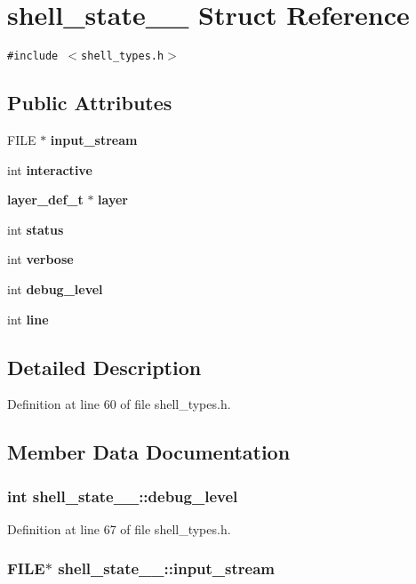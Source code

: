 \section{shell\_\-state\_\-\_\- Struct Reference}
\label{structshell__state____}
{\tt \#include $<$shell\_\-types.h$>$}

\subsection*{Public Attributes}
\begin{CompactItemize}
\item 
FILE $\ast$ {\bf input\_\-stream}
\item 
int {\bf interactive}
\item 
{\bf layer\_\-def\_\-t} $\ast$ {\bf layer}
\item 
int {\bf status}
\item 
int {\bf verbose}
\item 
int {\bf debug\_\-level}
\item 
int {\bf line}
\end{CompactItemize}


\subsection{Detailed Description}


Definition at line 60 of file shell\_\-types.h.

\subsection{Member Data Documentation}
\subsubsection[{debug\_\-level}]{\setlength{\rightskip}{0pt plus 5cm}int {\bf shell\_\-state\_\-\_\-::debug\_\-level}}\label{structshell__state_____0dbfbd99cd492b36f310c006616a7fc9}




Definition at line 67 of file shell\_\-types.h.
\subsubsection[{input\_\-stream}]{\setlength{\rightskip}{0pt plus 5cm}FILE$\ast$ {\bf shell\_\-state\_\-\_\-::input\_\-stream}}\label{structshell__state_____b9848d436ad635a7af41cf75e012f403}




